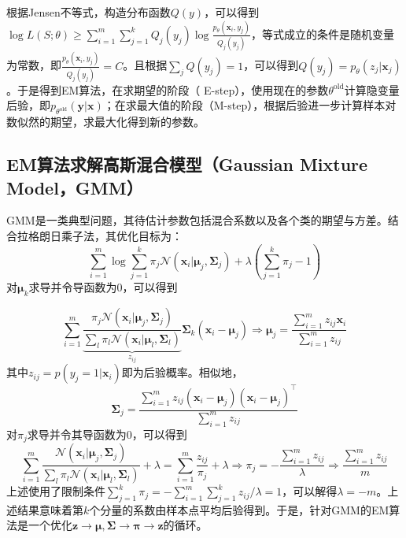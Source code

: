 \documentclass{article}
\begin{document}
	根据Jensen不等式，构造分布函数$Q(y)$，可以得到$\log L(S;\theta)\geq \sum_{i=1}^m \sum_{j=1}^k Q_j(y_j) \log \frac{p_\theta(\bm{x}_i, y_j)}{Q_j(y_j)}$，等式成立的条件是随机变量为常数，即$\frac{p_\theta(\bm{x}_i, y_j)}{Q_j(y_j)}=C$。且根据$\sum_j Q(y_j) =1$，可以得到$Q(y_j)=p_\theta(z_j|\bm{x}_j)$。于是得到EM算法，在求期望的阶段（ E-step），使用现在的参数$\theta^{\mathrm{old}}$计算隐变量后验，即$p_{\theta^{\mathrm{old}}}(\bm{y}|\bm{x})$；在求最大值的阶段（M-step），根据后验进一步计算样本对数似然的期望，求最大化得到新的参数。
	
	\subsection{EM算法求解高斯混合模型（Gaussian Mixture Model，GMM）}
	
	GMM是一类典型问题，其待估计参数包括混合系数以及各个类的期望与方差。结合拉格朗日乘子法，其优化目标为：
	\begin{equation}
	\sum_{i=1}^m \log \sum_{j=1}^k \pi_j \mathcal{N} (\bm{x}_i|\bm{\mu}_j,\bm{\Sigma}_j) + \lambda \left(\sum_{j=1}^k \pi_j - 1\right)
	\end{equation}
	对$\bm{\mu}_k$求导并令导函数为0，可以得到
	
	\begin{equation}
	\label{eq:GMM_mu}
	\sum_{i=1}^m \underbrace{\frac{\pi_j  \mathcal{N} (\bm{x}_i|\bm{\mu}_j,\bm{\Sigma}_j)}{\sum_l \pi_l \mathcal{N} (\bm{x}_i|\bm{\mu}_l,\bm{\Sigma}_l)}}_{z_{ij}} \bm{\Sigma}_k (\bm{x}_i - \bm{\mu}_j) \Longrightarrow \bm{\mu}_j=\frac{\sum_{i=1}^m z_{ij} \bm{x}_i}{\sum_{i=1}^m z_{ij}}
	\end{equation}
其中$z_{ij}=p(y_j=1|\bm{x}_i)$即为后验概率。相似地，
	\begin{equation}
	\label{eq:GMM_sigma}
	\bm{\Sigma}_j=\frac{\sum_{i=1}^m z_{ij} (\bm{x}_i-\bm{\mu}_j)(\bm{x}_i-\bm{\mu}_j)^\top}{\sum_{i=1}^m z_{ij}}
	\end{equation}
	对$\pi_j$求导并令其导函数为0，可以得到
	\begin{equation*}
	\label{eq:GMM_pi}
	\sum_{i=1}^m \frac{\mathcal{N} (\bm{x}_i|\bm{\mu}_j,\bm{\Sigma}_j) }{\sum_l \pi_l \mathcal{N} (\bm{x}_i|\bm{\mu}_l,\bm{\Sigma}_l)} + \lambda = \sum_{i=1}^m \frac{z_{ij}}{\pi_j} + \lambda \Longrightarrow \pi_j=-\frac{\sum_{i=1}^m z_{ij}}{\lambda} \Longrightarrow \frac{\sum_{i=1}^m z_{ij}}{m}
	\end{equation*}
上述使用了限制条件$\sum_{j=1}^k\pi_j=-\sum_{i=1}^m\sum_{j=1}^k z_{ij}/\lambda=1$，可以解得$\lambda=-m$。上述结果意味着第$k$个分量的系数由样本点平均后验得到。于是，针对GMM的EM算法是一个优化$\bm{z}\rightarrow\bm{\mu},\bm{\Sigma}\rightarrow\bm{\pi}\rightarrow\bm{z}$的循环。
		
\end{document}
